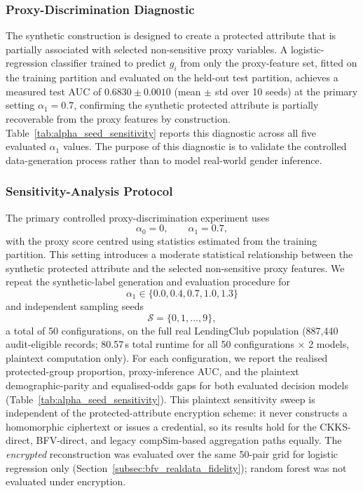 \documentclass[a4paper,fleqn]{cas-dc}
\begin{document}
\subsubsection{Proxy-Discrimination Diagnostic} The synthetic construction is designed to create a protected attribute that is partially associated with selected non-sensitive proxy variables. A logistic-regression classifier trained to predict $g_i$ from only the proxy-feature set, fitted on the training partition and evaluated on the held-out test partition, achieves a measured test AUC of $0.6830\pm0.0010$ (mean $\pm$ std over 10 seeds) at the primary setting $\alpha_1=0.7$, confirming the synthetic protected attribute is partially recoverable from the proxy features by construction. Table~\ref{tab:alpha_seed_sensitivity} reports this diagnostic across all five evaluated $\alpha_1$ values. The purpose of this diagnostic is to validate the controlled data-generation process rather than to model real-world gender inference.

\subsubsection{Sensitivity-Analysis Protocol} \label{subsec:sensitivity_protocol} The primary controlled proxy-discrimination experiment uses \[ \alpha_0=0, \qquad \alpha_1=0.7, \] with the proxy score centred using statistics estimated from the training partition. This setting introduces a moderate statistical relationship between the synthetic protected attribute and the selected non-sensitive proxy features. We repeat the synthetic-label generation and evaluation procedure for \[ \alpha_1\in\{0.0,0.4,0.7,1.0,1.3\} \] and independent sampling seeds \[ \mathcal{S}=\{0,1,\ldots,9\}, \] a total of 50 configurations, on the full real LendingClub population (887{,}440 audit-eligible records; 80.57\,s total runtime for all 50 configurations $\times$ 2 models, plaintext computation only). For each configuration, we report the realised protected-group proportion, proxy-inference AUC, and the plaintext demographic-parity and equalised-odds gaps for both evaluated decision models (Table~\ref{tab:alpha_seed_sensitivity}). This plaintext sensitivity sweep is independent of the protected-attribute encryption scheme: it never constructs a homomorphic ciphertext or issues a credential, so its results hold for the CKKS-direct, BFV-direct, and legacy compSim-based aggregation paths equally. The \emph{encrypted} reconstruction was evaluated over the same 50-pair grid for logistic regression only (Section~\ref{subsec:bfv_realdata_fidelity}); random forest was not evaluated under encryption.
\end{document}
